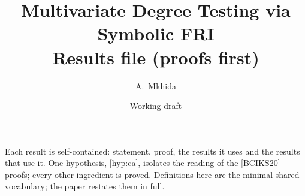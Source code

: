 \documentclass[11pt]{article}
\title{Multivariate Degree Testing via Symbolic FRI\\\large Results file (proofs first)}
\author{A.~Mkhida}
\date{Working draft}
\begin{document}
\maketitle
\noindent Each result is self-contained: statement, proof, the results it uses and the results
that use it. One hypothesis, \ref{hyp:ca}, isolates the reading of the [BCIKS20] proofs; every
other ingredient is proved. Definitions here are the minimal shared vocabulary; the paper
restates them in full.
\tableofcontents
































\end{document}
